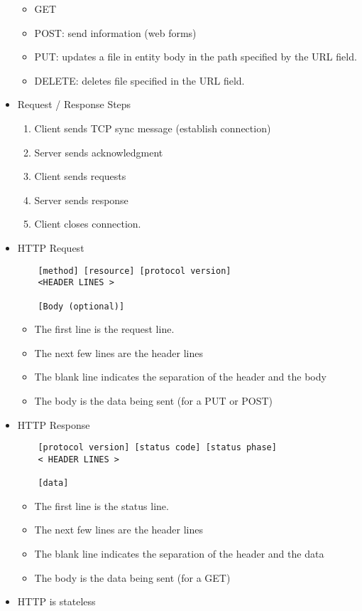 \begin{itemize}
  \begin{itemize}
  \tightlist
  \item
    GET
  \item
    POST: send information (web forms)
  \item
    PUT: updates a file in entity body in the path specified by the URL
    field.
  \item
    DELETE: deletes file specified in the URL field.
  \end{itemize}
\item
  Request / Response Steps

  \begin{enumerate}
  \def\labelenumi{\arabic{enumi}.}
  \tightlist
  \item
    Client sends TCP sync message (establish connection)
  \item
    Server sends acknowledgment
  \item
    Client sends requests
  \item
    Server sends response
  \item
    Client closes connection.
  \end{enumerate}
\item
  HTTP Request

\begin{verbatim}
    [method] [resource] [protocol version]
    <HEADER LINES >

    [Body (optional)]
\end{verbatim}

  \begin{itemize}
  \tightlist
  \item
    The first line is the request line.
  \item
    The next few lines are the header lines
  \item
    The blank line indicates the separation of the header and the body
  \item
    The body is the data being sent (for a PUT or POST)
  \end{itemize}
\item
  HTTP Response

\begin{verbatim}
    [protocol version] [status code] [status phase]
    < HEADER LINES >

    [data]
\end{verbatim}

  \begin{itemize}
  \tightlist
  \item
    The first line is the status line.
  \item
    The next few lines are the header lines
  \item
    The blank line indicates the separation of the header and the data
  \item
    The body is the data being sent (for a GET)
  \end{itemize}
\item
  HTTP is stateless


\end{itemize}
